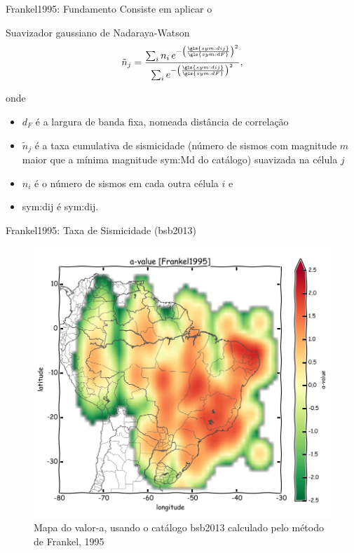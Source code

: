 \documentclass[ucs,8pt]{beamer}
\begin{document}
\begin{frame}{Frankel1995: Fundamento}
Consiste em aplicar o
\begin{block}{Suavizador gaussiano de Nadaraya-Watson}
\begin{equation}
	\ensuremath{
		\tilde{n}_j = \frac{ \sum_{i} n_i \,e^{ - \left(\frac{\gls{sym:dij}}{\gls{sym:dF}}\right)^2}}
						   { \sum_{i}     e^{ - \left(\frac{\gls{sym:dij}}{\gls{sym:dF}}\right)^2}},
	}
	\label{eq:ni}
\end{equation}
\end{block}
onde 
\begin{itemize}
	\item $d_F$ é a largura de banda \alert{fixa}, nomeada distância de
	correlação
	\item $\tilde{n}_j$ é a taxa cumulativa de sismicidade (número de sismos com magnitude
	$m$ maior que a mínima magnitude \gls{sym:Md} do catálogo) suavizada na célula $j$
	\item $n_i$ é o número de sismos em cada outra célula $i$ e
	\item \gls{sym:dij} é \glsdesc{sym:dij}.
\end{itemize}
\end{frame}


\begin{frame}{Frankel1995: Taxa de Sismicidade (\gls{bsb2013})}
\begin{figure}[H]
  \centering
  \includegraphics[height=.95\textheight]{a_frankel_br} 
  \caption{Mapa do valor-a, usando o catálogo \gls{bsb2013} calculado pelo método de Frankel, 1995 }
  \label{fig:a_fran_br} 
\end{figure}
\end{frame}
\end{document}

